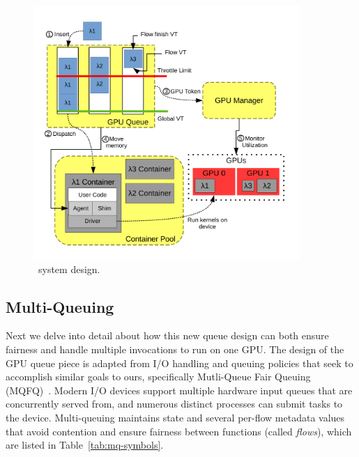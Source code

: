 \begin{figure}
  \centering
  \includegraphics[width=0.9\textwidth]{mqfq/figs/queue-sys-2-simple.pdf}
  \caption{\QName~system design.}
  \label{fig:sys-diag}
\end{figure}


\subsection{Multi-Queuing}
  
Next we delve into detail about how this new queue design can both ensure fairness and handle multiple invocations to run on one GPU.
The design of the GPU queue piece is adapted from I/O handling and queuing policies that seek to accomplish similar goals to ours, specifically Mutli-Queue Fair Queuing (MQFQ)~\cite{hedayati2019multi}.
Modern I/O devices support multiple hardware input queues that are concurrently served from, and numerous distinct processes can submit tasks to the device.
Multi-queuing maintains state and several per-flow metadata values that avoid contention and ensure fairness between functions (called \emph{flows}), which are listed in Table~\ref{tab:mq-symbols}.

